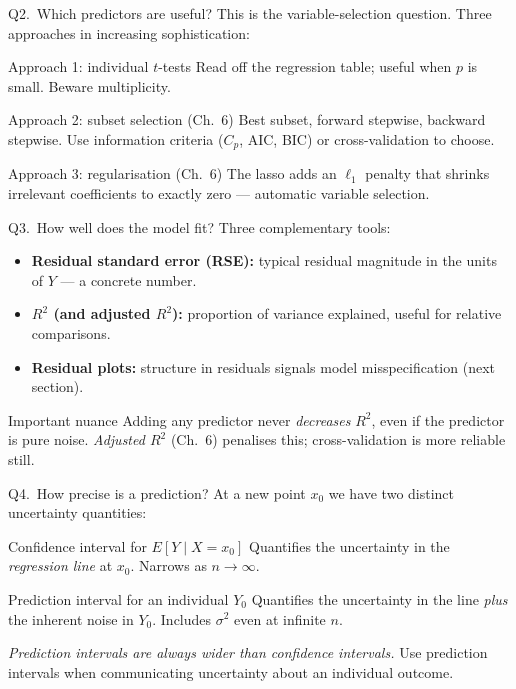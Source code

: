 \documentclass[aspectratio=169,11pt]{beamer}
\begin{document}
\begin{frame}{Q2.\ Which predictors are useful?}
  This is the variable-selection question. Three approaches in
  increasing sophistication:
  \begin{block}{Approach 1: individual $t$-tests}
    Read off the regression table; useful when $p$ is small. Beware
    multiplicity.
  \end{block}
  \begin{block}{Approach 2: subset selection (Ch.~6)}
    Best subset, forward stepwise, backward stepwise. Use information
    criteria ($C_p$, AIC, BIC) or cross-validation to choose.
  \end{block}
  \begin{block}{Approach 3: regularisation (Ch.~6)}
    The lasso adds an $\ell_1$ penalty that shrinks irrelevant
    coefficients to exactly zero --- automatic variable selection.
  \end{block}
\end{frame}

\begin{frame}{Q3.\ How well does the model fit?}
  Three complementary tools:
  \begin{itemize}
    \item \textbf{Residual standard error (RSE):} typical residual
          magnitude in the units of $Y$ --- a concrete number.
    \item \textbf{$R^2$ (and adjusted $R^2$):} proportion of variance
          explained, useful for relative comparisons.
    \item \textbf{Residual plots:} structure in residuals signals model
          misspecification (next section).
  \end{itemize}
  \begin{alertblock}{Important nuance}
    Adding any predictor never \emph{decreases} $R^2$, even if the
    predictor is pure noise. \emph{Adjusted $R^2$} (Ch.~6) penalises
    this; cross-validation is more reliable still.
  \end{alertblock}
\end{frame}

\begin{frame}{Q4.\ How precise is a prediction?}\label{frm:predint}
  At a new point $x_0$ we have two distinct uncertainty quantities:
  \begin{block}{Confidence interval for $E[Y \mid X = x_0]$}
    Quantifies the uncertainty in the \emph{regression line} at $x_0$.
    Narrows as $n \to \infty$.
  \end{block}
  \begin{block}{Prediction interval for an individual $Y_0$}
    Quantifies the uncertainty in the line \emph{plus} the inherent
    noise in $Y_0$. Includes $\sigma^2$ even at infinite $n$.
  \end{block}
  \begin{takeaway}
    \emph{Prediction intervals are always wider than confidence
    intervals.} Use prediction intervals when communicating
    uncertainty about an individual outcome.
  \end{takeaway}
\end{frame}
\end{document}
